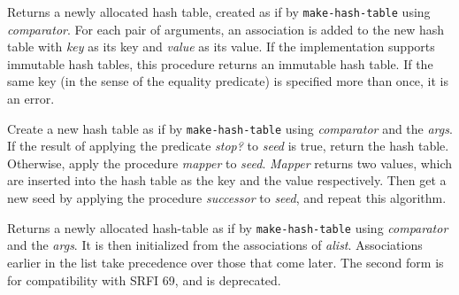 \begin{entry}{%
  }


  Returns a newly allocated hash table, created as if by
  \texttt{make-hash-table} using \emph{comparator}. For each pair of
  arguments, an association is added to the new hash table with
  \emph{key} as its key and \emph{value} as its value. If the
  implementation supports immutable hash tables, this procedure
  returns an immutable hash table.  If the same key (in the sense of
  the equality predicate) is specified more than once, it is an error.
\end{entry}

\begin{entry}{%
  }


  Create a new hash table as if by \texttt{make-hash-table} using
  \emph{comparator} and the \emph{args}. If the result of applying the
  predicate \emph{stop?} to \emph{seed} is true, return the hash
  table.  Otherwise, apply the procedure \emph{mapper} to \emph{seed}.
  \emph{Mapper} returns two values, which are inserted into the hash
  table as the key and the value respectively. Then get a new seed by
  applying the procedure \emph{successor} to \emph{seed}, and repeat
  this algorithm.
\end{entry}

\begin{entry}{%
  }

  Returns a newly allocated hash-table as if by
  \texttt{make-hash-table} using \emph{comparator} and the
  \emph{args}. It is then initialized from the associations of
  \emph{alist}. Associations earlier in the list take precedence over
  those that come later. The second form  is for compatibility with
  SRFI 69, and is deprecated.
\end{entry}

